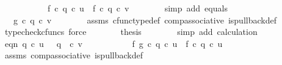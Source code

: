 \begin{isabellebody}
\ \ \isamarkupfalse%
\ {\isacharminus}{\kern0pt}\ \isanewline
\ \ \ \ \isamarkupfalse%
\ {\isachardoublequoteopen}f\ {\isasymcirc}\isactrlsub c\ {\isacharparenleft}{\kern0pt}q{}\ {\isasymcirc}\isactrlsub c\ u{\isacharparenright}{\kern0pt}\ {\isacharequal}{\kern0pt}\ f\ {\isasymcirc}\isactrlsub c\ q{}\ {\isasymcirc}\isactrlsub c\ v{\isachardoublequoteclose}\isanewline
\ \ \ \ \ \ \isamarkupfalse%
\ {\isacharparenleft}{\kern0pt}simp\ add{\isacharcolon}{\kern0pt}\ equals{\isacharparenright}{\kern0pt}\isanewline
\ \ \ \ \isamarkupfalse%
\ \isamarkupfalse%
\ {\isachardoublequoteopen}{\isachardot}{\kern0pt}{\isachardot}{\kern0pt}{\isachardot}{\kern0pt}\ {\isacharequal}{\kern0pt}\ g\ {\isasymcirc}\isactrlsub c\ {\isacharparenleft}{\kern0pt}q{}\ {\isasymcirc}\isactrlsub c\ v{\isacharparenright}{\kern0pt}{\isachardoublequoteclose}\isanewline
\ \ \ \ \ \ \isamarkupfalse%
\ assms{\isacharparenleft}{\kern0pt}{}{\isacharparenright}{\kern0pt}\ cfunc{\isacharunderscore}{\kern0pt}type{\isacharunderscore}{\kern0pt}def\ comp{\isacharunderscore}{\kern0pt}associative\ is{\isacharunderscore}{\kern0pt}pullback{\isacharunderscore}{\kern0pt}def\ \ \isamarkupfalse%
\ {\isacharparenleft}{\kern0pt}typecheck{\isacharunderscore}{\kern0pt}cfuncs{\isacharcomma}{\kern0pt}\ force{\isacharparenright}{\kern0pt}\isanewline
\ \ \ \ \isamarkupfalse%
\ \isamarkupfalse%
\ {\isacharquery}{\kern0pt}thesis\isanewline
\ \ \ \ \ \ \isamarkupfalse%
\ {\isacharparenleft}{\kern0pt}simp\ add{\isacharcolon}{\kern0pt}\ calculation{\isacharparenright}{\kern0pt}\isanewline
\ \ \isamarkupfalse%
\ \isanewline
\isanewline
\ \ \isamarkupfalse%
\ eqn{}{\isacharcolon}{\kern0pt}\ {\isachardoublequoteopen}q{}\ {\isasymcirc}\isactrlsub c\ u\ {\isacharequal}{\kern0pt}\ \ q{}\ \ {\isasymcirc}\isactrlsub c\ v{\isachardoublequoteclose}\isanewline
\ \ \isamarkupfalse%
\ {\isacharminus}{\kern0pt}\ \isanewline
\ \ \ \ \isamarkupfalse%
\ f{}{\isacharcolon}{\kern0pt}\ {\isachardoublequoteopen}g\ {\isasymcirc}\isactrlsub c\ q{}\ {\isasymcirc}\isactrlsub c\ u\ {\isacharequal}{\kern0pt}\ f\ {\isasymcirc}\isactrlsub c\ q{}\ {\isasymcirc}\isactrlsub c\ u{\isachardoublequoteclose}\isanewline
\ \ \ \ \ \ \isamarkupfalse%
\ assms{\isacharparenleft}{\kern0pt}{}{\isacharparenright}{\kern0pt}\ comp{\isacharunderscore}{\kern0pt}associative{}\ is{\isacharunderscore}{\kern0pt}pullback{\isacharunderscore}{\kern0pt}def\ \ \isamarkupfalse%

\end{isabellebody}
